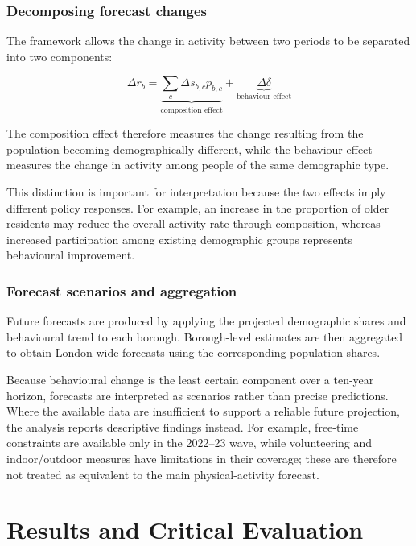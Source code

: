 \documentclass[ %
                    author={Ashrey Ashrey, Sanya Kapoor, Trisha Sharma, Yash Bhooshan Pandloskar},
                supervisor={Dr. Dalila O’Grady},
                    degree={MSc},
                     title={Using machine learning to forecast physical activity participation, volunteering and activity patterns in London},
                  subtitle={},
                      type={},
                      year={2021}]{dissertation}
\begin{document}
\FloatBarrier
\subsection{Decomposing forecast changes}

\noindent
The framework allows the change in activity between two periods to be separated into two components:

\[
\Delta r_b
=
\underbrace{
\sum_c \Delta s_{b,c}p_{b,c}
}_{\text{composition effect}}
+
\underbrace{
\Delta\delta
}_{\text{behaviour effect}}
\]

The composition effect therefore measures the change resulting from the population becoming demographically different, while the behaviour effect measures the change in activity among people of the same demographic type.

This distinction is important for interpretation because the two effects imply different policy responses. For example, an increase in the proportion of older residents may reduce the overall activity rate through composition, whereas increased participation among existing demographic groups represents behavioural improvement.

\FloatBarrier
\subsection{Forecast scenarios and aggregation}

\noindent
Future forecasts are produced by applying the projected demographic shares and behavioural trend to each borough. Borough-level estimates are then aggregated to obtain London-wide forecasts using the corresponding population shares.

Because behavioural change is the least certain component over a ten-year horizon, forecasts are interpreted as scenarios rather than precise predictions. Where the available data are insufficient to support a reliable future projection, the analysis reports descriptive findings instead. For example, free-time constraints are available only in the 2022--23 wave, while volunteering and indoor/outdoor measures have limitations in their coverage; these are therefore not treated as equivalent to the main physical-activity forecast.


\chapter{Results and Critical Evaluation}
\label{chap:evaluation}
\end{document}

